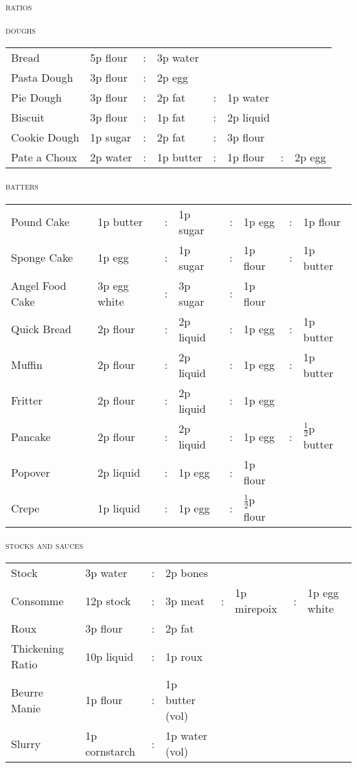 \documentclass[letterpaper,11pt]{article}
\newcommand{\sectionheader}[1]{
    \vspace{0.5em}
    {\small\textsc{#1}} \\
    \vspace{1em}
}
\begin{document}
\normalsize

\pagestyle{empty}
{\huge\scshape{ratios}}


\sectionheader{doughs}
{ \small
\begin{tabularx}{\textwidth}{ p{4cm} X c X c X c X }
Bread & 5p flour & : & 3p water & & & &  \\
Pasta Dough & 3p flour & : & 2p egg & & & & \\
Pie Dough & 3p flour & : & 2p fat & : & 1p water & & \\
Biscuit & 3p flour & : & 1p fat & : & 2p liquid & & \\
Cookie Dough & 1p sugar& : & 2p fat & : & 3p flour & & \\
Pate a Choux & 2p water & : & 1p butter & : & 1p flour & : & 2p egg \\
\end{tabularx}
}

\sectionheader{batters}
{ \small
\begin{tabularx}{\textwidth}{ p{4cm} X c X c X c X }
Pound Cake & 1p butter & : & 1p sugar & : & 1p egg & : & 1p flour \\
Sponge Cake & 1p egg & : & 1p sugar & : & 1p flour & : & 1p butter \\
Angel Food Cake & 3p egg white & : & 3p sugar & : & 1p flour & & \\
Quick Bread & 2p flour & : & 2p liquid & : & 1p egg & : & 1p butter \\
Muffin & 2p flour & : & 2p liquid & : & 1p egg & : & 1p butter \\
Fritter & 2p flour & : & 2p liquid & : & 1p egg & & \\
Pancake & 2p flour & : & 2p liquid & : & 1p egg & : & $\frac{1}{2}$p butter \\
Popover & 2p liquid & : & 1p egg & : & 1p flour & & \\
Crepe & 1p liquid & : & 1p egg & : & $\frac{1}{2}$p flour & & \\
\end{tabularx}
}

\sectionheader{stocks and sauces}
{ \small
\begin{tabularx}{\textwidth}{ p{4cm} X c X c X c X }
Stock & 3p water & : & 2p bones & & & & \\
Consomme & 12p stock & : & 3p meat & : & 1p mirepoix & : & 1p egg white \\
Roux & 3p flour & : & 2p fat & & & & \\
Thickening Ratio & 10p liquid & : & 1p roux & & & & \\
Beurre Manie & 1p flour & : & 1p butter (vol) & & & & \\
Slurry & 1p cornstarch & : & 1p water (vol) & & & & \\
\end{tabularx}
}
\end{document}
